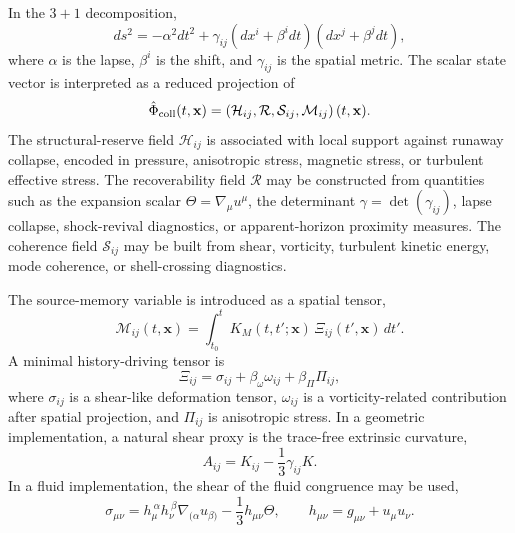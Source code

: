 \documentclass[11pt]{article}
\begin{document}
In the \(3+1\) decomposition,
\begin{equation}
ds^2=-\alpha^2dt^2+\gamma_{ij}\left(dx^i+\beta^i dt\right)\left(dx^j+\beta^j dt\right),
\end{equation}
where \(\alpha\) is the lapse, \(\beta^i\) is the shift, and \(\gamma_{ij}\) is the spatial metric. The scalar state vector is interpreted as a reduced projection of
\begin{equation}
\hat{\Phi}_{\rm coll}(t,\mathbf{x})=\left(\mathcal{H}_{ij},\mathcal{R},\mathcal{S}_{ij},\mathcal{M}_{ij}\right)(t,\mathbf{x}).
\end{equation}
The structural-reserve field \(\mathcal{H}_{ij}\) is associated with local support against runaway collapse, encoded in pressure, anisotropic stress, magnetic stress, or turbulent effective stress. The recoverability field \(\mathcal{R}\) may be constructed from quantities such as the expansion scalar \(\Theta=\nabla_\mu u^\mu\), the determinant \(\gamma=\det(\gamma_{ij})\), lapse collapse, shock-revival diagnostics, or apparent-horizon proximity measures. The coherence field \(\mathcal{S}_{ij}\) may be built from shear, vorticity, turbulent kinetic energy, mode coherence, or shell-crossing diagnostics.

The source-memory variable is introduced as a spatial tensor,
\begin{equation}
\mathcal{M}_{ij}(t,\mathbf{x})=\int_{t_0}^{t}K_M(t,t';\mathbf{x})\,\Xi_{ij}(t',\mathbf{x})\,dt'.
\end{equation}
A minimal history-driving tensor is
\begin{equation}
\Xi_{ij}=\sigma_{ij}+\beta_\omega\omega_{ij}+\beta_\Pi\Pi_{ij},
\end{equation}
where \(\sigma_{ij}\) is a shear-like deformation tensor, \(\omega_{ij}\) is a vorticity-related contribution after spatial projection, and \(\Pi_{ij}\) is anisotropic stress. In a geometric implementation, a natural shear proxy is the trace-free extrinsic curvature,
\begin{equation}
A_{ij}=K_{ij}-\frac{1}{3}\gamma_{ij}K.
\end{equation}
In a fluid implementation, the shear of the fluid congruence may be used,
\begin{equation}
\sigma_{\mu\nu}=h_{\mu}^{\ \alpha}h_{\nu}^{\ \beta}\nabla_{(\alpha}u_{\beta)}-\frac{1}{3}h_{\mu\nu}\Theta,
\qquad
h_{\mu\nu}=g_{\mu\nu}+u_\mu u_\nu.
\end{equation}
\end{document}
